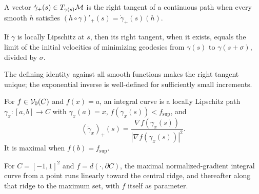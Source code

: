 \begin{definition}
\label{def:chow-iii-h40-right-tangent}
A vector $\dot\gamma_+(s)\in T_{\gamma(s)}\mathcal M$ is the right tangent of a continuous path
when every smooth $h$ satisfies $(h\circ\gamma)'_+(s)=\dot\gamma_+(s)(h)$.
\end{definition}

\begin{lemma}
\label{lem:chow-iii-h41-right-tangent-geodesics}
If $\gamma$ is locally Lipschitz at $s$, then its right tangent, when it exists, equals
the limit of the initial velocities of minimizing geodesics from $\gamma(s)$ to
$\gamma(s+\sigma)$, divided by $\sigma$.
\end{lemma}

\begin{remark}
\label{rem:chow-iii-h42-right-tangent-uniqueness}
The defining identity against all smooth functions makes the right tangent unique;
the exponential inverse is well-defined for sufficiently small increments.
\end{remark}

\begin{definition}
\label{def:chow-iii-h43-integral-curve}
For $f\in\mathcal V_0(C)$ and $f(x)=a$, an integral curve is a locally Lipschitz path
$\gamma_x:[a,b]\to C$ with $\gamma_x(a)=x$, $f(\gamma_x(s))<f_{\sup}$, and
\[
(\dot\gamma_x)_+(s)=\frac{\nabla f(\gamma_x(s))}{|\nabla f(\gamma_x(s))|^2}.
\]
It is maximal when $f(b)=f_{\sup}$.
\end{definition}

\begin{example}
\label{ex:chow-iii-h44-square-integral-curves}
For $C=[-1,1]^2$ and $f=d(\cdot,\partial C)$, the maximal normalized-gradient
integral curve from a point runs linearly toward the central ridge, and thereafter
along that ridge to the maximum set, with $f$ itself as parameter.
\end{example}

